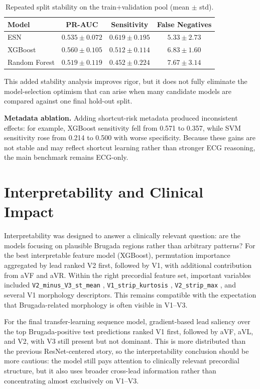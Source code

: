 \documentclass[10pt,twocolumn]{article}
\let\originaltexttt\texttt
\renewcommand{\texttt}[1]{%
  \begingroup
  \setlength{\fboxsep}{1.2pt}%
  \colorbox{inlinecodebg}{\originaltexttt{#1}}%
  \endgroup
}
\begin{document}
\begin{table}[!t]
\centering
\caption{Repeated split stability on the train+validation pool (mean $\pm$ std).}
\label{tab:stability}
\scriptsize
\begin{tabular}{lccc}
\toprule
Model & PR-AUC & Sensitivity & False Negatives \\
\midrule
ESN & $0.535 \pm 0.072$ & $0.619 \pm 0.195$ & $5.33 \pm 2.73$ \\
XGBoost & $0.560 \pm 0.105$ & $0.512 \pm 0.114$ & $6.83 \pm 1.60$ \\
Random Forest & $0.519 \pm 0.119$ & $0.452 \pm 0.224$ & $7.67 \pm 3.14$ \\
\bottomrule
\end{tabular}
\end{table}

This added stability analysis improves rigor, but it does not fully eliminate the model-selection optimism that can arise when many candidate models are compared against one final hold-out split.

\textbf{Metadata ablation.} Adding shortcut-risk metadata produced inconsistent effects: for example, XGBoost sensitivity fell from 0.571 to 0.357, while SVM sensitivity rose from 0.214 to 0.500 with worse specificity. Because these gains are not stable and may reflect shortcut learning rather than stronger ECG reasoning, the main benchmark remains ECG-only.

\section{Interpretability and Clinical Impact}
Interpretability was designed to answer a clinically relevant question: are the models focusing on plausible Brugada regions rather than arbitrary patterns? For the best interpretable feature model (XGBoost), permutation importance aggregated by lead ranked V2 first, followed by V1, with additional contribution from aVF and aVR. Within the right precordial feature set, important variables included \texttt{V2\_minus\_V3\_st\_mean}, \texttt{V1\_strip\_kurtosis}, \texttt{V2\_strip\_max}, and several V1 morphology descriptors. This remains compatible with the expectation that Brugada-related morphology is often visible in V1--V3.

For the final transfer-learning sequence model, gradient-based lead saliency over the top Brugada-positive test predictions ranked V1 first, followed by aVF, aVL, and V2, with V3 still present but not dominant. This is more distributed than the previous ResNet-centered story, so the interpretability conclusion should be more cautious: the model still pays attention to clinically relevant precordial structure, but it also uses broader cross-lead information rather than concentrating almost exclusively on V1--V3.
\end{document}
